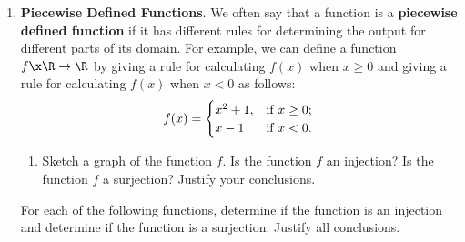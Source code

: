 \begin{enumerate}


\item \textbf{Piecewise Defined Functions}.  We often say that a function is a \textbf{piecewise defined function}
%
%
\label{exer:piecewisefunction}%
 if it has different rules for determining the output for different parts of its domain.  For example, we can define a function $f\x\R \to \R$ by giving a rule for calculating $f(x)$ when $x \geq 0$ and giving a rule for calculating $f(x)$ when $x < 0$ as follows:
\begin{equation}
f(x) = 
\begin{cases}
x^2 + 1,    &  \text{if $x \geq 0$;} \\
x - 1      &  \text{if $x < 0$.}
\end{cases} \notag
\end{equation}
\begin{enumerate}
\item Sketch a graph of the function $f$\!.  Is the function $f$ an injection?  Is the function $f$ a surjection?  Justify your conclusions. 
\end{enumerate}

For each of the following functions, determine if the function is an injection and determine if the function is a surjection.  Justify all conclusions.
\label{exer:piecewisefunction2}%


\end{enumerate}
